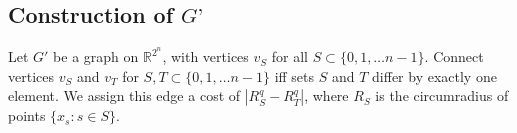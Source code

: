 \subsection{Construction of $G’$}

Let $G'$ be a graph on $\mathbb{R}^{2^n}$, with vertices $v_{S}$ for all $S
\subset \{0,1,\ldots n-1\}$. Connect vertices $v_S$ and $v_T$ for $S, T \subset
\{0, 1, \ldots n-1\}$ iff sets $S$ and $T$ differ by exactly one element. We
assign this edge a cost of $|R_{S}^q - R_{T}^q|$, where $R_{S}$ is the
circumradius of points $\{x_s : s \in S\}$.
